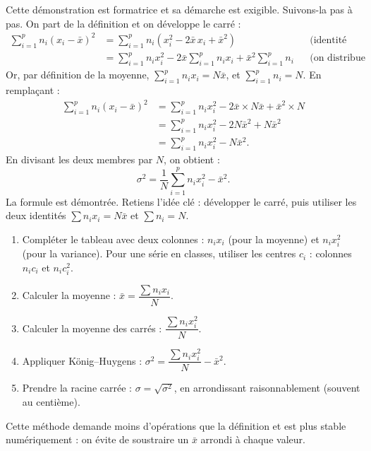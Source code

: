 \documentclass[11pt]{article}
\begin{document}
\begin{experience}
Cette démonstration est formatrice et sa démarche est exigible. Suivons-la pas à pas. On part de la définition et on développe le carré :
\begin{align*}
\sum_{i=1}^{p} n_i (x_i - \bar{x})^2 &= \sum_{i=1}^{p} n_i \left(x_i^2 - 2\bar{x}\,x_i + \bar{x}^2\right) & &\text{(identité remarquable)}\\
&= \sum_{i=1}^{p} n_i x_i^2 - 2\bar{x}\sum_{i=1}^{p} n_i x_i + \bar{x}^2 \sum_{i=1}^{p} n_i & &\text{(on distribue et on sort les constantes)}
\end{align*}
Or, par définition de la moyenne, $\displaystyle\sum_{i=1}^{p} n_i x_i = N\bar{x}$, et $\displaystyle\sum_{i=1}^{p} n_i = N$. En remplaçant :
\begin{align*}
\sum_{i=1}^{p} n_i (x_i - \bar{x})^2 &= \sum_{i=1}^{p} n_i x_i^2 - 2\bar{x} \times N\bar{x} + \bar{x}^2 \times N\\
&= \sum_{i=1}^{p} n_i x_i^2 - 2N\bar{x}^2 + N\bar{x}^2\\
&= \sum_{i=1}^{p} n_i x_i^2 - N\bar{x}^2.
\end{align*}
En divisant les deux membres par $N$, on obtient :
\[ \sigma^2 = \frac{1}{N}\sum_{i=1}^{p} n_i x_i^2 - \bar{x}^2. \]
La formule est démontrée. Retiens l'idée clé : développer le carré, puis utiliser les deux identités $\sum n_i x_i = N\bar{x}$ et $\sum n_i = N$.
\end{experience}

\begin{methode}
\begin{enumerate}
\item Compléter le tableau avec deux colonnes : $n_i x_i$ (pour la moyenne) et $n_i x_i^2$ (pour la variance). Pour une série en classes, utiliser les centres $c_i$ : colonnes $n_i c_i$ et $n_i c_i^2$.
\item Calculer la moyenne : $\bar{x} = \dfrac{\sum n_i x_i}{N}$.
\item Calculer la moyenne des carrés : $\dfrac{\sum n_i x_i^2}{N}$.
\item Appliquer König–Huygens : $\sigma^2 = \dfrac{\sum n_i x_i^2}{N} - \bar{x}^2$.
\item Prendre la racine carrée : $\sigma = \sqrt{\sigma^2}$, en arrondissant raisonnablement (souvent au centième).
\end{enumerate}
Cette méthode demande moins d'opérations que la définition et est plus stable numériquement : on évite de soustraire un $\bar{x}$ arrondi à chaque valeur.
\end{methode}
\end{document}
